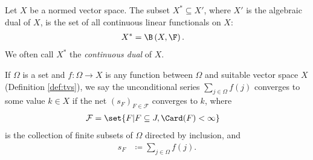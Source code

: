 \begin{definition}
  Let $X$ be a normed vector space. The subset $X^{\ast}\subseteq X'$, where $X'$ is the algebraic dual of $X$, is the set of all continuous linear functionals on $X$:
  \begin{align*}
    X^{\ast} &= \B\left(X,\F\right).
  \end{align*}
  We often call $X^{\ast}$ the \textit{continuous dual} of $X$.
\end{definition}
\begin{definition}\label{def:unconditional_summability}
  If $\Omega$ is a set and $f\colon \Omega\rightarrow X$ is any function between $\Omega$ and suitable vector space $X$ (Definition \ref{def:tvs}), we say the unconditional series $\sum_{j\in\Omega}f(j)$ converges to some value $k\in X$ if the net $\left(s_{F}\right)_{F\in \mathcal{F}}$ converges to $k$, where
  \begin{align*}
    \mathcal{F} &= \set{F | F\subseteq J,\Card(F) < \infty}
  \end{align*}
  is the collection of finite subsets of $\Omega$ directed by inclusion, and
  \begin{align*}
    s_{F} &\coloneq \sum_{j\in\Omega}f(j).
  \end{align*}
\end{definition}
